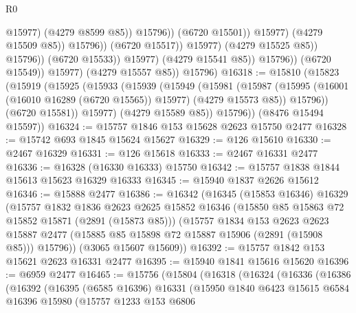\begin{lexlean}{R0}
\begin{coremodule}
                                                  @15977)
                                                (@4279 @8599 @85))
                                              @15796))
                                          (@6720 @15501))
                                        @15977)
                                      (@4279 @15509 @85))
                                    @15796))
                                (@6720 @15517))
                              @15977)
                            (@4279 @15525 @85))
                          @15796))
                      (@6720 @15533))
                    @15977)
                  (@4279 @15541 @85))
                @15796))
            (@6720 @15549))
          @15977)
        (@4279 @15557 @85))
      @15796)
@16318 := @15810
    (@15823
      (@15919
        (@15925
          (@15933
            (@15939
              (@15949
                (@15981
                  (@15987
                    (@15995 (@16001 (@16010 @16289 (@6720 @15565)) @15977) (@4279 @15573 @85))
                    @15796))
                (@6720 @15581))
              @15977)
            (@4279 @15589 @85))
          @15796))
      (@8476 @15494 @15597))
@16324 := @15757 @1846 @153 @15628 @2623 @15750 @2477
@16328 := @15742 @693 @1845 @15624 @15627
@16329 := @126 @15610
@16330 := @2467 @16329
@16331 := @126 @15618
@16333 := @2467 @16331 @2477
@16336 := @16328 (@16330 @16333) @15750
@16342 := @15757 @1838 @1844 @15613 @15623 @16329 @16333
@16345 := @15940 @1837 @2626 @15612
@16346 := @15888 @2477
@16386 := @16342
    (@16345
      (@15853 @16346)
      @16329
      (@15757
        @1832
        @1836
        @2623
        @2625
        @15852
        @16346
        (@15850 @85 @15863 @72 @15852 @15871 (@2891 (@15873 @85)))
        (@15757
          @1834
          @153
          @2623
          @2623
          @15887
          @2477
          (@15885 @85 @15898 @72 @15887 @15906 (@2891 (@15908 @85)))
          @15796))
      (@3065 @15607 @15609))
@16392 := @15757 @1842 @153 @15621 @2623 @16331 @2477
@16395 := @15940 @1841 @15616 @15620
@16396 := @6959 @2477
@16465 := @15756
    (@15804
      (@16318
        (@16324
          (@16336
            (@16386
              (@16392
                (@16395
                  (@6585 @16396)
                  @16331
                  (@15950
                    @1840
                    @6423
                    @15615
                    @6584
                    @16396
                    @15980
                    (@15757
                      @1233
                      @153
                      @6806

\end{coremodule}
\end{lexlean}
